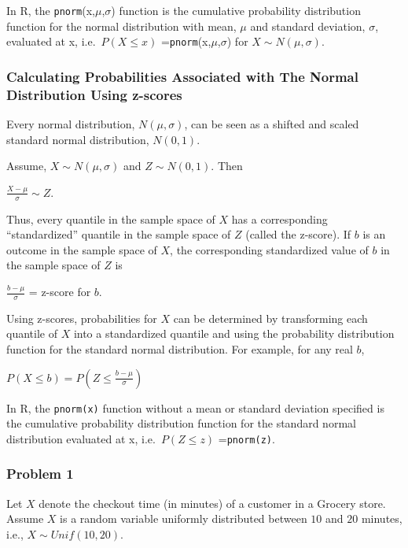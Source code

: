 \documentclass[]{article}
\begin{document}
In R, the \texttt{pnorm}(x,\(\mu\),\(\sigma\)) function is the
cumulative probability distribution function for the normal distribution
with mean, \(\mu\) and standard deviation, \(\sigma\), evaluated at x,
i.e.~\(P(X \leq x)\) =\texttt{pnorm}(x,\(\mu\),\(\sigma\)) for
\(X \sim N(\mu,\sigma)\).

\hypertarget{calculating-probabilities-associated-with-the-normal-distribution-using-z-scores}{%
\subsubsection{Calculating Probabilities Associated with The Normal
Distribution Using
z-scores}\label{calculating-probabilities-associated-with-the-normal-distribution-using-z-scores}}

Every normal distribution, \(N(\mu,\sigma)\), can be seen as a shifted
and scaled standard normal distribution, \(N(0,1)\).

Assume, \(X \sim N(\mu,\sigma)\) and \(Z \sim N(0,1)\). Then

\(\frac{X-\mu}{\sigma} \sim Z\).

Thus, every quantile in the sample space of \(X\) has a corresponding
``standardized'' quantile in the sample space of \(Z\) (called the
z-score). If \(b\) is an outcome in the sample space of \(X\), the
corresponding standardized value of \(b\) in the sample space of \(Z\)
is

\(\frac{b-\mu}{\sigma}\) = z-score for \(b\).

Using z-scores, probabilities for \(X\) can be determined by
transforming each quantile of \(X\) into a standardized quantile and
using the probability distribution function for the standard normal
distribution. For example, for any real \(b\),

\(P(X \leq b) = P(Z \leq \frac{b-\mu}{\sigma})\)

In R, the \texttt{pnorm(x)} function without a mean or standard
deviation specified is the cumulative probability distribution function
for the standard normal distribution evaluated at x,
i.e.~\(P(Z \leq z)\) =\texttt{pnorm(z)}.

\hypertarget{problem-1}{%
\subsubsection{Problem 1}\label{problem-1}}

Let \(X\) denote the checkout time (in minutes) of a customer in a
Grocery store. Assume \(X\) is a random variable uniformly distributed
between \(10\) and \(20\) minutes, i.e., \(X \sim Unif(10, 20)\).
\end{document}
